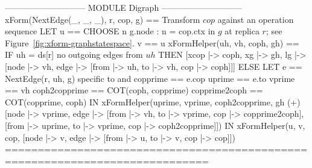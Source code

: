\documentclass{article}
\begin{document}
\begin{tla}
----------------------------- MODULE Digraph -----------------------------
xForm(NextEdge(_, _, _), r, cop, g) == \* Transform $cop$ against an operation sequence 
    LET u == CHOOSE n \in g.node : n = cop.ctx \* in $g$ at replica $r$; see Figure~\ref{fig:xform-graphstatespace}.
        v == u 
        xFormHelper(uh, vh, coph, gh) == 
            IF uh = ds[r] \* no outgoing edges from $uh$
            THEN [xcop |-> coph, 
                  xg |-> gh,
                  lg |-> [node |-> {vh}, edge |-> {[from |-> uh, to |-> vh, cop |-> coph]}]] 
            ELSE LET e == NextEdge(r, uh, g) \* specific to \cjupiter{} and \xjupiter{}
                     copprime == e.cop
                     uprime == e.to
                     vprime == vh 
                     coph2copprime == COT(coph, copprime)
                     copprime2coph == COT(copprime, coph)
                 IN  xFormHelper(uprime, vprime, coph2copprime,
                        gh (+) [node |-> {vprime},
                                edge |-> {[from |-> vh, to |-> vprime, 
                                            cop |-> copprime2coph], 
                                          [from |-> uprime, to |-> vprime, 
                                            cop |-> coph2copprime]}])
    IN  xFormHelper(u, v, cop, [node |-> {v}, 
                                edge |-> {[from |-> u, to |-> v, cop |-> cop]}])  
=============================================================================
\end{tla}
\end{document}
